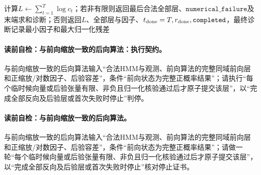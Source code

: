 \begin{AlgorithmContract}
\begin{algorithm}[H]
计算$L\leftarrow\sum_{t=1}^T\log c_t$；若非有限则返回最后合法全部层、$\mathtt{numerical\_failure}$及末端求和诊断；否则返回$L$、全部层与因子、$t_{\rm done}=T,r_{\rm done},\mathtt{completed}$，最终诊断记录最小因子和最大归一化残差\;
\end{algorithm}
\end{AlgorithmContract}

\paragraph{读前自检：与前向缩放一致的后向算法：执行契约。}与前向缩放一致的后向算法输入“合法HMM与观测、前向算法的完整同域前向层和正缩放/对数因子、后验容差”，条件“前向状态为完整正概率结果”；请执行“每个临时候向量或后验张量有限、非负且归一化核验通过后才原子提交该层”，以“完成全部反向及后验层或首次失败时停止”判停。\par
\paragraph{读前自检：与前向缩放一致的后向算法。}与前向缩放一致的后向算法输入“合法HMM与观测、前向算法的完整同域前向层和正缩放/对数因子、后验容差”，条件“前向状态为完整正概率结果”；请做一轮“每个临时候向量或后验张量有限、非负且归一化核验通过后才原子提交该层”，以“完成全部反向及后验层或首次失败时停止”核对停止证书。\par

